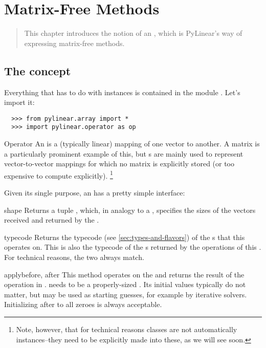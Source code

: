 \chapter{Matrix-Free Methods}
\label{cha:matrixfree}

\begin{quote}
   This chapter introduces the notion of an , which
   is PyLinear's way of expressing matrix-free methods.
\end{quote}

\section{The  concept}

Everything that has to do with  instances is contained in the
module . Let's import it:

\begin{verbatim}
  >>> from pylinear.array import *
  >>> import pylinear.operator as op
\end{verbatim}

\begin{classdesc*}{Operator}
  An  is a (typically linear) mapping
  of one vector to another. A matrix is a particularly prominent
  example of this, but s are mainly used to represent
  vector-to-vector mappings for which no matrix is explicitly stored (or too
  expensive to compute explicitly).
  \footnote{
    Note, however, that for technical reasons  classes are
    not automatically  instances--they need to be
    explicitly made into these, as we will see soon.
  }
\end{classdesc*}

Given its single purpose, an  has a pretty 
simple interface:
\begin{memberdesc}[Operator]{shape}
  Returns a tuple , which, in analogy to a ,
  specifies the sizes of the vectors received and returned by the
  .
\end{memberdesc}
\begin{methoddesc}[Operator]{typecode}{}
  Returns the typecode (see \ref{sec:types-and-flavors}) of the
  s that this  operates on. This is also
  the typecode of the s returned by the operations of this
  . For technical reasons, the two always match.
\end{methoddesc}
\begin{methoddesc}[Operator]{apply}{before, after}
  This method operates on the   and returns
  the result of the operation in . 
  needs to be a properly-sized . Its initial values
  typically do not matter, but may be used as starting guesses,
  for example by iterative solvers. Initializing after to
  all zeroes is always acceptable.
\end{methoddesc}

